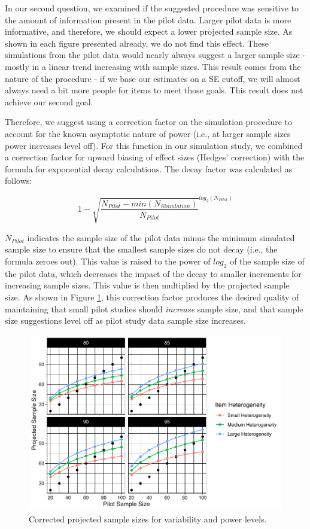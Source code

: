 \documentclass[
  man]{apa7}
\begin{document}
In our second question, we examined if the suggested procedure was sensitive to the amount of information present in the pilot data. Larger pilot data is more informative, and therefore, we should expect a lower projected sample size. As shown in each figure presented already, we do not find this effect. These simulations from the pilot data would nearly always suggest a larger sample size - mostly in a linear trend increasing with sample sizes. This result comes from the nature of the procedure - if we base our estimates on a SE cutoff, we will almost always need a bit more people for items to meet those goals. This result does not achieve our second goal.

Therefore, we suggest using a correction factor on the simulation procedure to account for the known asymptotic nature of power (i.e., at larger sample sizes power increases level off). For this function in our simulation study, we combined a correction factor for upward biasing of effect sizes (Hedges' correction) with the formula for exponential decay calculations. The decay factor was calculated as follows:

\[ 1 - \sqrt{\frac{N_{Pilot} - min(N_{Simulation})}{N_{Pilot}}}^{log_2(N_{Pilot})}\]

\(N_{Pilot}\) indicates the sample size of the pilot data minus the minimum simulated sample size to ensure that the smallest sample sizes do not decay (i.e., the formula zeroes out). This value is raised to the power of \(log_2\) of the sample size of the pilot data, which decreases the impact of the decay to smaller increments for increasing sample sizes. This value is then multiplied by the projected sample size. As shown in Figure \ref{fig:corrected-figure}, this correction factor produces the desired quality of maintaining that small pilot studies should \emph{increase} sample size, and that sample size suggestions level off as pilot study data sample size increases.

\begin{figure}
\centering
\includegraphics{manuscript_draft_files/figure-latex/corrected-figure-1.pdf}
\caption{\label{fig:corrected-figure}Corrected projected sample sizes for variability and power levels.}
\end{figure}
\end{document}
